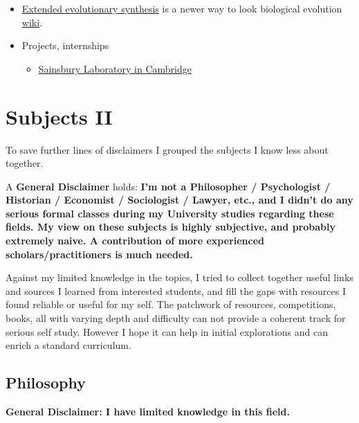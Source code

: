 \documentclass{article}
\begin{document}
\begin{itemize}
    \item \href{https://extendedevolutionarysynthesis.com/}{Extended evolutionary synthesis} is a newer way to look biological evolution \href{https://en.wikipedia.org/wiki/Extended_evolutionary_synthesis}{wiki}.
    
    \item Projects, internships
    \begin{itemize}
        \item \href{https://www.slcu.cam.ac.uk/people/gpsep}{Sainsbury Laboratory in Cambridge}
    \end{itemize}
    
\end{itemize}

\section{Subjects II}

To save further lines of disclaimers I grouped the subjects I know less about together.

A \textbf{General Disclaimer} holds:
\textbf{I'm not a Philosopher / Psychologist / Historian / Economist / Sociologist / Lawyer, etc., and I didn't do any serious formal classes during my University studies regarding these fields. My view on these subjects is highly subjective, and probably extremely naive. A contribution of more experienced scholars/practitioners is much needed.}

Against my limited knowledge in the topics, I tried to collect together useful links and sources I learned from interested students, and fill the gaps with resources I found reliable or useful for my self.
The patchwork of resources, competitions, books, all with varying depth and difficulty can not provide a coherent track for serious self study. However I hope it can help in initial explorations and can enrich a standard curriculum.

\subsection{Philosophy}
\textbf{General Disclaimer: I have limited knowledge in this field.}
\end{document}

